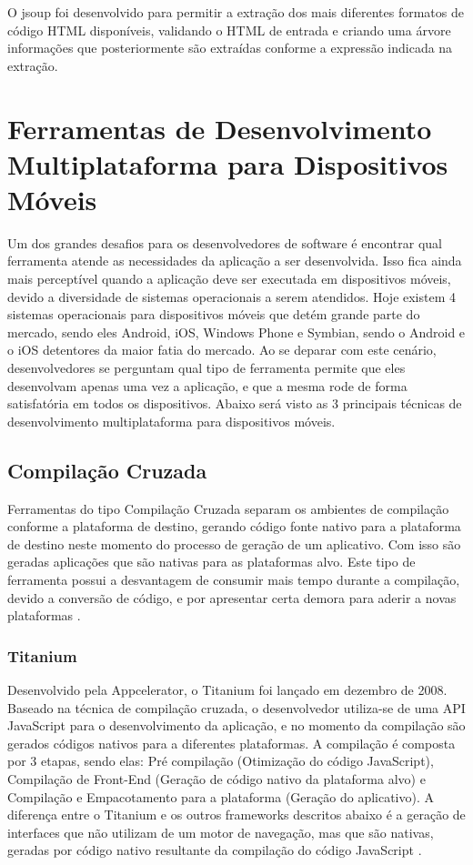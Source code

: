 O jsoup foi desenvolvido para permitir a extração dos mais diferentes formatos de código HTML disponíveis, validando o HTML de entrada e criando uma árvore informações que posteriormente são extraídas conforme a expressão indicada na extração\cite{JSOUP}.

\section{Ferramentas de Desenvolvimento Multiplataforma para Dispositivos Móveis}
Um dos grandes desafios para os desenvolvedores de software é encontrar qual ferramenta atende as necessidades da aplicação a ser desenvolvida. Isso fica ainda mais perceptível quando a aplicação deve ser executada em dispositivos móveis, devido a diversidade de sistemas operacionais a serem atendidos. Hoje existem 4 sistemas operacionais para dispositivos móveis que detém grande parte do mercado, sendo eles Android, iOS, Windows Phone e Symbian, sendo o Android e o iOS detentores da maior fatia do mercado. Ao se deparar com este cenário, desenvolvedores se perguntam qual tipo de ferramenta permite que eles desenvolvam apenas uma vez a aplicação, e que a mesma rode de forma satisfatória em todos os dispositivos. Abaixo será visto as 3 principais técnicas de desenvolvimento multiplataforma para dispositivos móveis\cite{CrossPlatformMobileDevelopment2011}.

\subsection{Compilação Cruzada}
Ferramentas do tipo Compilação Cruzada separam os ambientes de compilação conforme a plataforma de destino, gerando código fonte nativo para a plataforma de destino neste momento do processo de geração de um aplicativo. Com isso são geradas aplicações que são nativas para as plataformas alvo. Este tipo de ferramenta possui a desvantagem de consumir mais tempo durante a compilação, devido a conversão de código, e por apresentar certa demora para aderir a novas plataformas
\cite{CrossPlatformMobileDevelopment2011}.

\subsubsection{Titanium}
Desenvolvido pela Appcelerator, o Titanium foi lançado em dezembro de 2008. Baseado na técnica de compilação cruzada, o desenvolvedor utiliza-se de uma API JavaScript para o desenvolvimento da aplicação, e no momento da compilação são gerados códigos nativos para a diferentes plataformas. A compilação é composta por 3 etapas, sendo elas: Pré compilação (Otimização do código JavaScript), Compilação de Front-End (Geração de código nativo da plataforma alvo) e Compilação e Empacotamento para a plataforma (Geração do aplicativo). A diferença entre o Titanium e os outros frameworks descritos abaixo é a geração de interfaces que não utilizam de um motor de navegação, mas que são nativas, geradas por código nativo resultante da compilação do código JavaScript
\cite{CrossPlatformMobileDevelopment2011}.

